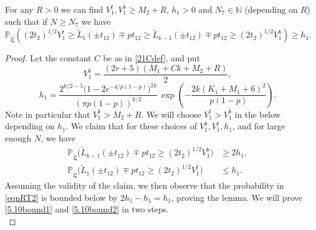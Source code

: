 \begin{lemma}\label{LemmaBP2} For any $R > 0$ we can find $V_1^t, V_1^b \geq M_2 + R$, $h_1 > 0$ and $N_7 \in \mathbb{N}$ (depending on $R$) such that if $N \geq N_7$ we have
	\begin{equation}\label{eqnRT2}
	\mathbb{P}_{\tilde{\mathfrak{L}}} \left(  (2t_2)^{1/2} V_1^t \geq \tilde{L}_1(\pm t_{12}) \mp p t_{12} \geq \tilde{L}_{k-1}(\pm t_{12}) \mp p t_{12} \geq (2t_2)^{1/2} V_1^b  \right) \geq h_1.
	\end{equation}
	
\end{lemma}

\begin{proof}
	
	Let the constant $C$ be as in \eqref{21Cdef}, and put
	\begin{equation}\label{5.10Vb}
	V_1^b = \frac{(2r+5)(M_1 + Ck + M_2 + R)}{2},
	\end{equation}
	\begin{equation}\label{5.10h1}
	h_1 =  \frac{2^{k/2-5}\big(1-2e^{-4/p(1-p)}\big)^{2k}}{(\pi p(1-p))^{k/2}}\,\exp\left(-\frac{2k(K_1+M_1+6)^2}{p(1-p)}\right).
	\end{equation}
	Note in particular that $V_1^b > M_2 + R$. We will choose $V_1^t > V_1^b$ in the below depending on $h_1$. We claim that for these choices of  $V_1^b, V_1^t, h_1$, and for large enough $N$, we have 
	\begin{align}
	\mathbb{P}_{\tilde{\mathfrak{L}}}\Big(\tilde{L}_{k-1}(\pm t_{12}) \mp pt_{12} \geq (2t_2)^{1/2}V_1^b\Big) &\geq 2h_1, \label{5.10bound1}\\
	\mathbb{P}_{\tilde{\mathfrak{L}}}\Big(\tilde{L}_1(\pm t_{12}) \mp pt_{12} \geq (2t_2)^{1/2}V_1^t\Big) &\leq h_1. \label{5.10bound2}
	\end{align}
	Assuming the validity of the claim, we then observe that the probability in \eqref{eqnRT2} is bounded below by $2h_1 - h_1 = h_1$, proving the lemma. We will prove \eqref{5.10bound1} and \eqref{5.10bound2} in two steps.\\
	

\end{proof}
